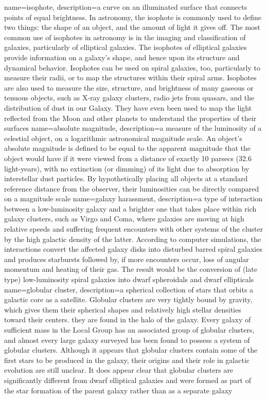{
	name={isophote},
	description={a curve on an illuminated surface that connects points of equal brightness. In astronomy, the isophote is commonly used to define two things: the shape of an object, and the amount of light it gives off. The most common use of isophotes in astronomy is in the imaging and classification of galaxies, particularly of elliptical galaxies. The isophotes of elliptical galaxies provide information on a galaxy's shape, and hence upon its structure and dynamical behavior. Isophotes can be used on spiral galaxies, too, particularly to measure their radii, or to map the structures within their spiral arms. Isophotes are also used to measure the size, structure, and brightness of many gaseous or tenuous objects, such as X-ray galaxy clusters, radio jets from quasars, and the distribution of dust in our Galaxy. They have even been used to map the light reflected from the Moon and other planets to understand the properties of their surfaces}
}
{
	name={absolute magnitude},
	description={a measure of the luminosity of a celestial object, on a logarithmic astronomical magnitude scale. An object's absolute magnitude is defined to be equal to the apparent magnitude that the object would have if it were viewed from a distance of exactly 10 parsecs (32.6 light-years), with no extinction (or dimming) of its light due to absorption by interstellar dust particles. By hypothetically placing all objects at a standard reference distance from the observer, their luminosities can be directly compared on a magnitude scale}
} 
{
	name={galaxy harassment},
	description={a type of interaction between a low-luminosity galaxy and a brighter one that takes place within rich galaxy clusters, such as Virgo and Coma, where galaxies are moving at high relative speeds and suffering frequent encounters with other systems of the cluster by the high galactic density of the latter. According to computer simulations, the interactions convert the affected galaxy disks into disturbed barred spiral galaxies and produces starbursts followed by, if more encounters occur, loss of angular momentum and heating of their gas. The result would be the conversion of (late type) low-luminosity spiral galaxies into dwarf spheroidals and dwarf ellipticals}
}
{
	name={globular cluster},
	description={a spherical collection of stars that orbits a galactic core as a satellite. Globular clusters are very tightly bound by gravity, which gives them their spherical shapes and relatively high stellar densities toward their centers. they are found in the halo of the galaxy. Every galaxy of sufficient mass in the Local Group has an associated group of globular clusters, and almost every large galaxy surveyed has been found to possess a system of globular clusters. Although it appears that globular clusters contain some of the first stars to be produced in the galaxy, their origins and their role in galactic evolution are still unclear. It does appear clear that globular clusters are significantly different from dwarf elliptical galaxies and were formed as part of the star formation of the parent galaxy rather than as a separate galaxy}
}
